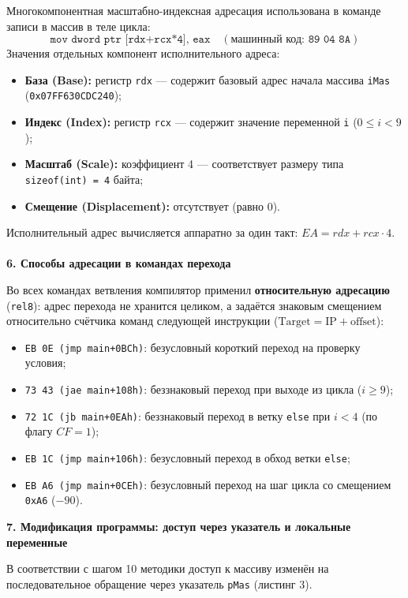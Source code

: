 \documentclass[14pt, a4paper]{extarticle}
\begin{document}
	Многокомпонентная масштабно-индексная адресация использована в команде записи в массив в теле цикла:
	\begin{equation*}
		\texttt{mov dword ptr [rdx+rcx*4], eax} \quad (\text{машинный код: } \texttt{89 04 8A})
	\end{equation*}
	Значения отдельных компонент исполнительного адреса:
	\begin{itemize}[noitemsep]
		\item \textbf{База (Base):} регистр \texttt{rdx} --- содержит базовый адрес начала массива \texttt{iMas} (\texttt{0x07FF630CDC240});
		\item \textbf{Индекс (Index):} регистр \texttt{rcx} --- содержит значение переменной \texttt{i} ($0 \le i < 9$);
		\item \textbf{Масштаб (Scale):} коэффициент 4 --- соответствует размеру типа \texttt{sizeof(int) = 4} байта;
		\item \textbf{Смещение (Displacement):} отсутствует (равно 0).
	\end{itemize}
	Исполнительный адрес вычисляется аппаратно за один такт: $EA = rdx + rcx \cdot 4$.
	\\\\
	\noindent \textbf{6. Способы адресации в командах перехода}
	
	Во всех командах ветвления компилятор применил \textbf{относительную адресацию} (\texttt{rel8}): адрес перехода не хранится целиком, а задаётся знаковым смещением относительно счётчика команд следующей инструкции ($\text{Target} = \text{IP} + \text{offset}$):
	\begin{itemize}[noitemsep]
		\item \texttt{EB 0E (jmp main+0BCh)}: безусловный короткий переход на проверку условия;
		\item \texttt{73 43 (jae main+108h)}: беззнаковый переход при выходе из цикла ($i \ge 9$);
		\item \texttt{72 1C (jb main+0EAh)}: беззнаковый переход в ветку \texttt{else} при $i < 4$ (по флагу $CF = 1$);
		\item \texttt{EB 1C (jmp main+106h)}: безусловный переход в обход ветки \texttt{else};
		\item \texttt{EB A6 (jmp main+0CEh)}: безусловный переход на шаг цикла со смещением \texttt{0xA6} ($-90$).
	\end{itemize}

	\noindent \textbf{7. Модификация программы: доступ через указатель и локальные переменные}
	
	В соответствии с шагом 10 методики доступ к массиву изменён на последовательное обращение через указатель \texttt{pMas} (листинг 3).
	
\end{document}
